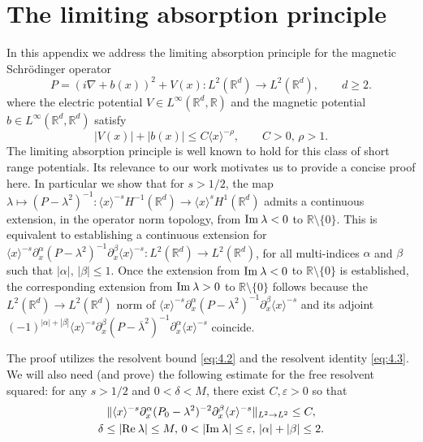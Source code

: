 \documentclass[11pt]{amsart}
\numberwithin{equation}{section}
\def\R{{\mathbb R}}
\def\Re{{\rm Re}\:}
\def\Im{{\rm Im}\:}
\begin{document}
\section{The limiting absorption principle} \label{limiting absorption appendix}

In this appendix we address the limiting absorption principle for the magnetic Schr\"odinger operator 
\begin{equation*}
P=(i\nabla+b(x))^2+V(x) : L^2(\R^d) \to L^2(\R^d), \qquad d \ge 2.
\end{equation*}
where the electric potential $V\in L^\infty(\mathbb{R}^d,\mathbb{R})$ and the magnetic potential  $b\in L^\infty(\mathbb{R}^d,\mathbb{R}^d)$ satisfy
\begin{equation*}
|V(x)|+|b(x)|\le C\langle x\rangle^{-\rho}, \qquad C>0,\,\rho>1.
\end{equation*}
The limiting absorption principle is well known to hold for this class of short range potentials. Its relevance to our work motivates us to provide a concise proof here. In particular we show that for $s > 1/2$, the map $\lambda \mapsto (P-\lambda^2)^{-1} : \langle x\rangle^{-s}H^{-1}(\mathbb{R}^d)\to \langle x\rangle^{s}H^1(\mathbb{R}^d)$ admits a continuous extension, in the operator norm topology, from $\Im \lambda < 0$ to $\R \setminus \{0\}$. This is equivalent to establishing a continuous extension for $\langle x \rangle^{-s} \partial^\alpha_x(P-\lambda^2)^{-1} \partial^\beta_x \langle x \rangle^{-s} : L^2(\R^d) \to L^2(\R^d)$, for all multi-indices $\alpha$ and $\beta$ such that $|\alpha|, \, |\beta| \le 1$. Once the extension from $\Im \lambda < 0$ to $\R \setminus \{0\}$ is established, the corresponding extension from $\Im \lambda > 0$ to $\R \setminus \{0\}$ follows because the $L^2(\R^d) \to L^2(\R^d)$ norm of $\langle x \rangle^{-s} \partial^\alpha_x(P-\lambda^2)^{-1} \partial^\beta_x \langle x \rangle^{-s}$ and its adjoint $(-1)^{|\alpha| + |\beta|}\langle x \rangle^{-s} \partial^\beta_x(P-\overline{\lambda}^2)^{-1} \partial^\alpha_x \langle x \rangle^{-s}$ coincide.

The proof utilizes the resolvent bound \eqref{eq:4.2} and the resolvent identity \eqref{eq:4.3}. We will also need (and prove) the following estimate for the free resolvent squared: for any $s > 1/2$ and $0 < \delta < M$, there exist $C, \varepsilon  > 0$ so that
\begin{equation} \label{bd resolv square}
\begin{gathered}
\| \langle x \rangle^{-s} \partial^\alpha_x (P_0 - \lambda^2)^{-2} \partial^\beta_x  \langle x \rangle^{-s} \|_{L^2 \to L^2} \le C, \\  \delta \le |\Re \lambda | \le M, \, 0 < |\Im \lambda| \le \varepsilon, \, |\alpha| + |\beta| \le 2.
\end{gathered}
\end{equation}
 
\end{document}

